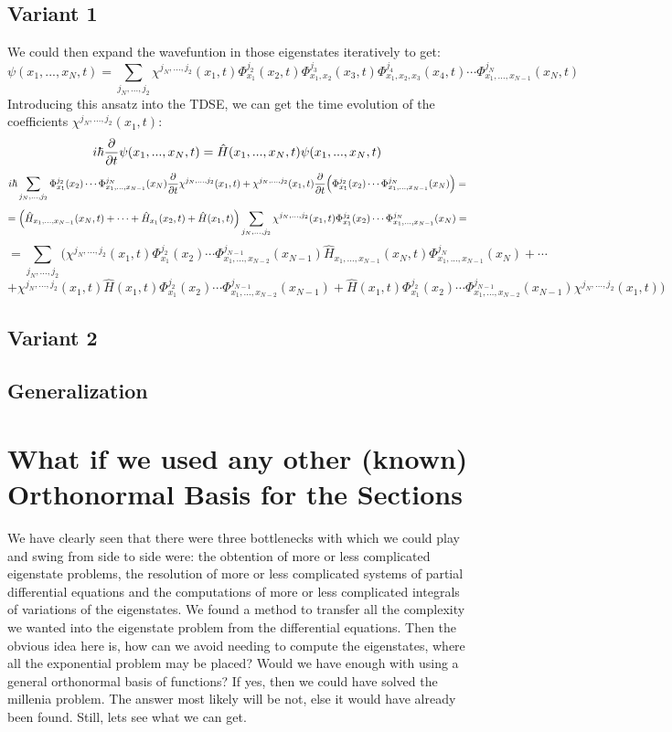 \documentclass[11pt, a4paper]{article} %
\begin{document}
\subsection{Variant 1}
We could then expand the wavefuntion in those eigenstates iteratively to get:
\begin{equation}
\psi(x_1,...,x_N,t)=\sum_{j_N,...,j_2} \chi^{j_N,...,j_2}(x_1,t) \Phi^{j_2}_{x_1}(x_2,t) \Phi^{j_3}_{x_1,x_2}(x_3,t) \Phi^{j_4}_{x_1, x_2, x_3}(x_4,t)\cdots \Phi^{j_N}_{x_1,... ,x_{N-1}}(x_N, t)
\end{equation}
Introducing this ansatz into the TDSE, we can get the time evolution of the coefficients $\chi^{j_N,...,j_2}(x_1,t)$:
\begin{equation}
i\hbar\pdv{}{t}\psi(x_1,...,x_N,t)= \hat{H}(x_1,...,x_N,t)\psi(x_1,...,x_N,t)
\end{equation}
$$
i\hbar\sum_{j_N,...,j_2}  \Phi^{j_2}_{x_1}(x_2) \cdots \Phi^{j_N}_{x_1,... ,x_{N-1}}(x_N)\pdv{}{t}\chi^{j_N,...,j_2}(x_1,t) + \chi^{j_N,...,j_2}(x_1,t) \pdv{}{t}\qty(\Phi^{j_2}_{x_1}(x_2) \cdots \Phi^{j_N}_{x_1,... ,x_{N-1}}(x_N)) =
$$
$$
 =\qty( \hat{H}_{x_1,...,x_{N-1}}(x_N,t)+\cdots+\hat{H}_{x_1}(x_2,t)+ \hat{H}(x_1,t))\sum_{j_N,...,j_2} \chi^{j_N,...,j_2}(x_1,t) \Phi^{j_2}_{x_1}(x_2)\cdots \Phi^{j_N}_{x_1,... ,x_{N-1}}(x_N)=
$$
$$
 =\sum_{j_N,...,j_2}\Big(  \chi^{j_N,...,j_2}(x_1,t) \Phi^{j_2}_{x_1}(x_2)\cdots \Phi^{j_{N-1}}_{x_1,... ,x_{N-2}}(x_{N-1})\hat{H}_{x_1,...,x_{N-1}}(x_N,t)\Phi^{j_{N}}_{x_1,... ,x_{N-1}}(x_{N})+\cdots
$$
$$
+ \chi^{j_N,...,j_2}(x_1,t)\hat{H}(x_1,t)\Phi^{j_2}_{x_1}(x_2)\cdots \Phi^{j_{N-1}}_{x_1,... ,x_{N-2}}(x_{N-1})+ \hat{H}(x_1,t)\Phi^{j_2}_{x_1}(x_2)\cdots \Phi^{j_{N-1}}_{x_1,... ,x_{N-2}}(x_{N-1})\chi^{j_N,...,j_2}(x_1,t)\Big)
$$




\subsection{Variant 2}

\subsection{Generalization}

\newpage
\section{What if we used any other (known) Orthonormal Basis for the Sections}
We have clearly seen that there were three bottlenecks with which we could play and swing from side to side were: the obtention of more or less complicated eigenstate problems, the resolution of more or less complicated systems of partial differential equations and the computations of more or less complicated integrals of variations of the eigenstates. We found a method to transfer all the complexity we wanted into the eigenstate problem from the differential equations. Then the obvious idea here is, how can we avoid needing to compute the eigenstates, where all the exponential problem may be placed? Would we have enough with using a general orthonormal basis of functions? If yes, then we could have solved the millenia problem. The answer most likely will be not, else it would have already been found. Still, lets see what we can get.
\end{document}
